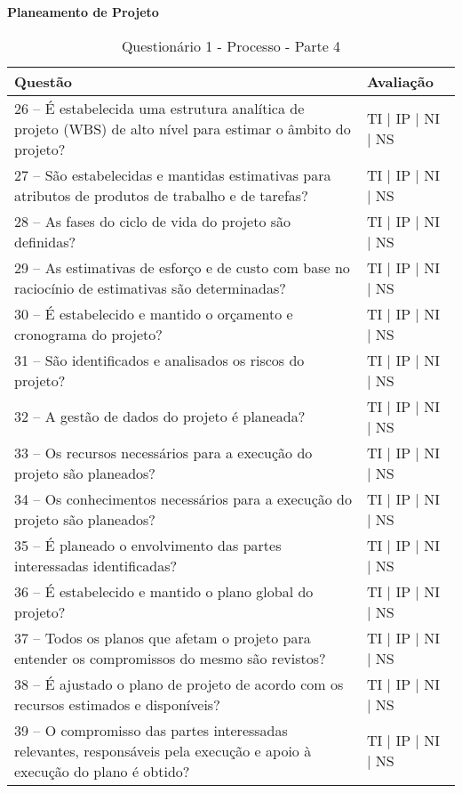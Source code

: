 \documentclass[openany,10pt,a4paper]{article}
\begin{document}
\begin{appendix}
\begin{table}[h]
\textbf{Planeamento de Projeto}
	\centering
	\caption{Questionário 1 - Processo - Parte 4}
	\begin{tabular}{p{3.5in}p{2in}}		
		\toprule
		\textbf{Questão}  & \textbf{Avaliação}\\ 
		\midrule
		26 – É estabelecida uma estrutura analítica de projeto (WBS) de alto nível para estimar o âmbito 
do projeto?
 & TI | IP | NI | NS \\
        \midrule
		27 – São estabelecidas e mantidas estimativas para atributos de produtos de trabalho e de 
tarefas?
 & TI | IP | NI | NS \\
		\midrule
        28 – As fases do ciclo de vida do projeto são definidas?
 & TI | IP | NI | NS \\
		\midrule
        29 – As estimativas de esforço e de custo com base no raciocínio de estimativas são 
determinadas?
 & TI | IP | NI | NS \\
		\midrule
		30 – É estabelecido e mantido o orçamento e cronograma do projeto?
  & TI | IP | NI | NS \\
		\midrule
		31 – São identificados e analisados os riscos do projeto?
 & TI | IP | NI | NS \\
		\midrule
		32 – A gestão de dados do projeto é planeada?
 & TI | IP | NI | NS \\
        \midrule
        33 – Os recursos necessários para a execução do projeto são planeados?
 & TI | IP | NI | NS \\
        \midrule
         34 – Os conhecimentos necessários para a execução do projeto são planeados?
         & TI | IP | NI | NS \\
         \midrule
         35 – É planeado o envolvimento das partes interessadas identificadas?
         & TI | IP | NI | NS \\
         \midrule
         36 – É estabelecido e mantido o plano global do projeto?
         & TI | IP | NI | NS \\
         \midrule
         37 – Todos os planos que afetam o projeto para entender os compromissos do mesmo são 
revistos?
         & TI | IP | NI | NS \\
         \midrule
         38 – É ajustado o plano de projeto de acordo com os recursos estimados e disponíveis?
         & TI | IP | NI | NS \\
         \midrule
        39 – O compromisso das partes interessadas relevantes, responsáveis pela execução e apoio à 
execução do plano é obtido?
         & TI | IP | NI | NS \\
		\bottomrule
	\end{tabular} 
	\label{tab:tabela1}
\end{table}


\end{appendix}
\end{document}
